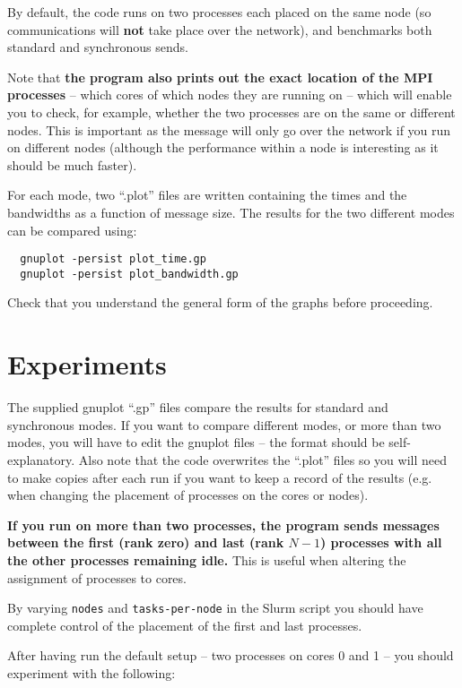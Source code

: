 \documentclass{article}
\begin{document}
By default, the code runs on two processes each placed on the same
node (so communications will {\bf not} take place over the network),
and benchmarks both standard and synchronous sends.

Note that {\bf the program also prints out the exact location of the
  MPI processes} -- which cores of which nodes they are running on --
which will enable you to check, for example, whether the two processes
are on the same or different nodes. This is important as the message
will only go over the network if you run on different nodes (although
the performance within a node is interesting as it should be much
faster).

For each mode, two ``.plot'' files are written containing the times and
the bandwidths as a function of message size. The results for the two
different modes can be compared using:

\begin{verbatim}
  gnuplot -persist plot_time.gp
  gnuplot -persist plot_bandwidth.gp
\end{verbatim}

Check that you understand the general form of the graphs before
proceeding.

\section{Experiments}

The supplied gnuplot ``.gp'' files compare the results for standard and
synchronous modes. If you want to compare different modes, or more than
two modes, you will have to edit the gnuplot files -- the format should
be self-explanatory. Also note that the code overwrites the ``.plot''
files so you will need to make copies after each run if you want to keep
a record of the results (e.g. when changing the placement of processes
on the cores or nodes).

{\bf If you run on more than two processes, the program sends messages
  between the first (rank zero) and last (rank $N-1$) processes with
  all the other processes remaining idle.} This is useful when
altering the assignment of processes to cores.

By varying \verb+nodes+ and \verb+tasks-per-node+ in the Slurm script
you should have complete control of the placement of the first and
last processes.

After having run the default setup -- two processes on cores 0 and 1
-- you should experiment with the following:
\end{document}
